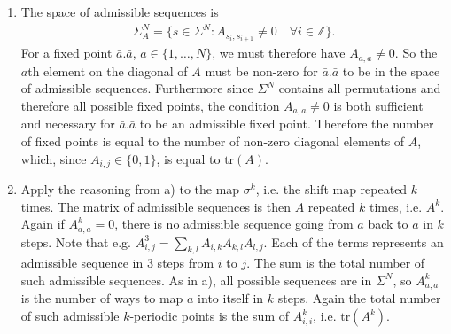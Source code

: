 \begin{solution}[7.5]
	\begin{enumerate}
		\item The space of admissible sequences is
\begin{align}
    \Sigma_A^N = \{ s\in \Sigma^N : A_{s_i, s_{i+1}} \ne 0 \quad \forall i \in \mathbb{Z} \}.
\end{align}
For a fixed point $\bar{a}.\bar{a}$, $a \in \{1, \ldots , N\}$, we must therefore have $A_{a,a} \ne 0$. So the $a$th element on the diagonal of $A$ must be non-zero for $\bar{a}.\bar{a}$ to be in the space of admissible sequences. Furthermore since $\Sigma^N$ contains all permutations and therefore all possible fixed points, the condition $A_{a,a} \ne 0$ is both sufficient and necessary for $\bar{a}.\bar{a}$ to be an admissible fixed point. Therefore the number of fixed points is equal to the number of non-zero diagonal elements of $A$, which, since $A_{i,j} \in \{0,1\}$, is equal to $\text{tr}(A)$. 
\item
Apply the reasoning from a) to the map $\sigma^k$, i.e. the shift map repeated $k$ times. The matrix of admissible sequences is then $A$ repeated $k$ times, i.e. $A^k$. Again if $A^k_{a,a} = 0$, there is no admissible sequence going from $a$ back to $a$ in $k$ steps. Note that e.g. $A^3_{i,j} = \sum_{k,l} A_{i,k} A_{k,l} A_{l,j}$. Each of the terms represents an admissible sequence in 3 steps from $i$ to $j$. The sum is the total number of such admissible sequences. As in a), all possible sequences are in $\Sigma^N$, so $A^k_{a,a}$ is the number of ways to map $a$ into itself in $k$ steps. Again the total number of such admissible $k$-periodic points is the sum of $A^k_{i,i}$, i.e. $\text{tr}(A^k)$.


\end{enumerate}
\end{solution}
